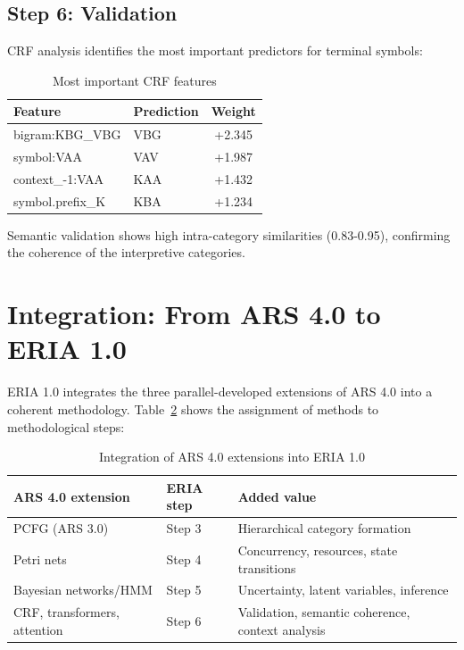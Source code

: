\documentclass[12pt,a4paper]{article}
\begin{document}
\subsection{Step 6: Validation}

CRF analysis identifies the most important predictors for terminal symbols:

\begin{table}[H]
\centering
\caption{Most important CRF features}
\label{tab:crf}
\begin{tabular}{@{} l l c @{}}
\toprule
\textbf{Feature} & \textbf{Prediction} & \textbf{Weight} \\
\midrule
bigram:KBG\_VBG & VBG & +2.345 \\
symbol:VAA & VAV & +1.987 \\
context\_-1:VAA & KAA & +1.432 \\
symbol.prefix\_K & KBA & +1.234 \\
\bottomrule
\end{tabular}
\end{table}

Semantic validation shows high intra-category similarities (0.83-0.95), confirming the coherence of the interpretive categories.

\section{Integration: From ARS 4.0 to ERIA 1.0}

ERIA 1.0 integrates the three parallel-developed extensions of ARS 4.0 into a coherent methodology. Table~\ref{tab:integration} shows the assignment of methods to methodological steps:

\begin{table}[H]
\centering
\caption{Integration of ARS 4.0 extensions into ERIA 1.0}
\label{tab:integration}
\begin{tabular}{@{} p{3cm} p{4cm} p{6cm} @{}}
\toprule
\textbf{ARS 4.0 extension} & \textbf{ERIA step} & \textbf{Added value} \\
\midrule
PCFG (ARS 3.0) & Step 3 & Hierarchical category formation \\
Petri nets & Step 4 & Concurrency, resources, state transitions \\
Bayesian networks/HMM & Step 5 & Uncertainty, latent variables, inference \\
CRF, transformers, attention & Step 6 & Validation, semantic coherence, context analysis \\
\bottomrule
\end{tabular}
\end{table}
\end{document}
